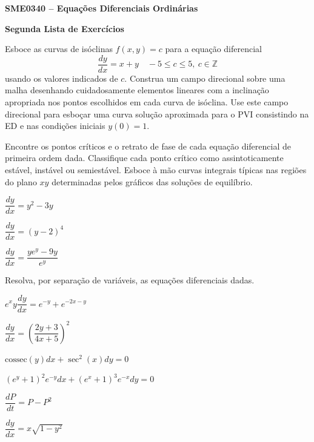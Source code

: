 \documentclass[oneside,12pt,a4paper]{report}
\begin{document}
    \begin{center}
        \fontsize{17.28}{17.28}
            \textbf{SME0340 -- Equações Diferenciais Ordinárias}

            \textbf{Segunda Lista de Exercícios}
    \end{center}



     Esboce as curvas de isóclinas $f(x,y)=c$ para a equação diferencial
    \[\frac{dy}{dx}=x+y\quad-5\leq c\leq 5,~c\in\mathbb{Z}\] 
    usando os valores indicados de $c$. Construa um campo direcional sobre uma malha desenhando cuidadosamente elementos lineares com a inclinação apropriada nos pontos escolhidos em cada curva de isóclina. Use este campo direcional para esboçar uma curva solução aproximada para o PVI consistindo na ED e nas condições iniciais $y(0)=1$.

     Encontre os pontos críticos e o retrato de fase de cada equação diferencial de primeira ordem dada. Classifique cada ponto crítico como assintoticamente estável, instável ou semiestável. Esboce à mão curvas integrais típicas nas regiões do plano $xy$ determinadas pelos gráficos das soluções de equilíbrio.
    \begin{itensquestao}[3]
        \item $\dfrac{dy}{dx}=y^2-3y$
        \item $\dfrac{dy}{dx}=(y-2)^4$
        \item $\dfrac{dy}{dx}=\dfrac{ye^y-9y}{e^y}$
    \end{itensquestao}

     Resolva, por separação de variáveis, as equações diferenciais dadas.
    \begin{itensquestao}[2]
        \item $e^xy\dfrac{dy}{dx}=e^{-y}+e^{-2x-y}$
        \item $\dfrac{dy}{dx} = \left(\dfrac{2y+3}{4x+5}\right)^2$
        \item $\mathrm{cossec}(y)dx+\sec^2(x)dy=0$
        \item $(e^y+1)^2e^{-y}dx+(e^x+1)^3e^{-x}dy=0$
        \item $\dfrac{dP}{dt}=P-P^2$
        \item $\dfrac{dy}{dx}=x\sqrt{1-y^2}$
    \end{itensquestao}
\end{document}
